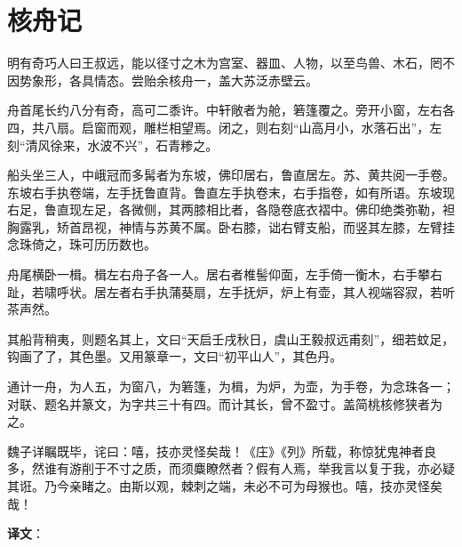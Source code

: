 \documentclass[12pt,UTF-8,openany,a4]{ctexbook}
\begin{document}
\chapter{核舟记}

\begin{large}
    
    明有奇巧人曰王叔远，能以径寸之木为宫室、器皿、人物，以至鸟兽、木石，罔不因势象形，各具情态。尝贻余核舟一，盖大苏泛赤壁云。
    
    舟首尾长约八分有奇，高可二黍许。中轩敞者为舱，箬篷覆之。旁开小窗，左右各四，共八扇。启窗而观，雕栏相望焉。闭之，则右刻“山高月小，水落石出”，左刻“清风徐来，水波不兴”，石青糁之。
    
    船头坐三人，中峨冠而多髯者为东坡，佛印居右，鲁直居左。苏、黄共阅一手卷。东坡右手执卷端，左手抚鲁直背。鲁直左手执卷末，右手指卷，如有所语。东坡现右足，鲁直现左足，各微侧，其两膝相比者，各隐卷底衣褶中。佛印绝类弥勒，袒胸露乳，矫首昂视，神情与苏黄不属。卧右膝，诎右臂支船，而竖其左膝，左臂挂念珠倚之，珠可历历数也。
    
    舟尾横卧一楫。楫左右舟子各一人。居右者椎髻仰面，左手倚一衡木，右手攀右趾，若啸呼状。居左者右手执蒲葵扇，左手抚炉，炉上有壶，其人视端容寂，若听茶声然。
    
    其船背稍夷，则题名其上，文曰“天启壬戌秋日，虞山王毅叔远甫刻”，细若蚊足，钩画了了，其色墨。又用篆章一，文曰“初平山人”，其色丹。
    
    通计一舟，为人五，为窗八，为箬篷，为楫，为炉，为壶，为手卷，为念珠各一；对联、题名并篆文，为字共三十有四。而计其长，曾不盈寸。盖简桃核修狭者为之。
    
    魏子详瞩既毕，诧曰：嘻，技亦灵怪矣哉！《庄》《列》所载，称惊犹鬼神者良多，然谁有游削于不寸之质，而须麋瞭然者？假有人焉，举我言以复于我，亦必疑其诳。乃今亲睹之。由斯以观，棘刺之端，未必不可为母猴也。嘻，技亦灵怪矣哉！

\end{large}


\newpage

\begin{Large}
   \noindent \textbf{译文}：
\end{Large}

\vspace{1em}
\end{document}
